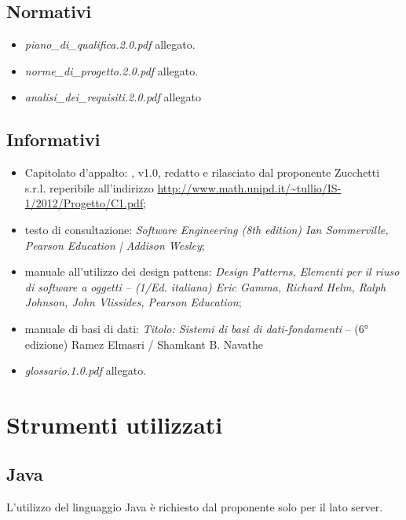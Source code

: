 \subsection{Normativi}
\begin{itemize}
\item[] \textit{piano\_di\_qualifica.2.0.pdf} allegato.
\item[] \textit{norme\_di\_progetto.2.0.pdf} allegato.
\item[] \textit{analisi\_dei\_requisiti.2.0.pdf} allegato
\end{itemize}

\subsection{Informativi}
\begin{itemize}
\item[] Capitolato d'appalto: \caName{}, v1.0, redatto e rilasciato dal proponente Zucchetti s.r.l. reperibile all'indirizzo \url{http://www.math.unipd.it/~tullio/IS-1/2012/Progetto/C1.pdf};
\item[] testo di consultazione: \textit{Software Engineering (8th edition) Ian Sommerville, Pearson Education | Addison Wesley};
\item[] manuale all'utilizzo dei design pattens: \textit{Design Patterns, Elementi per il riuso di software a oggetti -- (1/Ed. italiana) Eric Gamma, Richard Helm, Ralph Johnson, John Vlissides, Pearson Education};
\item[] manuale di basi di dati: \textit{Titolo: Sistemi di basi di dati-fondamenti} -- (6° edizione) Ramez Elmasri / Shamkant B. Navathe
\item[] \textit{glossario.1.0.pdf} allegato.
\end{itemize}
\clearpage

\section{Strumenti utilizzati}
\subsection{Java}
L'utilizzo del linguaggio Java è richiesto dal proponente solo per il lato server.

